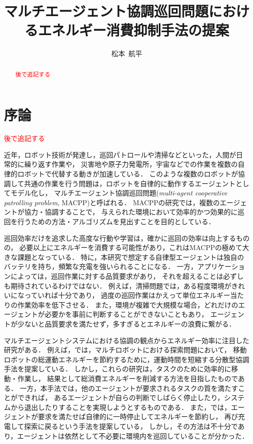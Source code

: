 \documentclass[12pt,a4j,twoside]{jarticle}
\title{マルチエージェント協調巡回問題におけるエネルギー消費抑制手法の提案}{5}
\author{松本~航平}
\def\red#1{\textcolor{red}{#1}}
\begin{document}
\maketitle

\begin{abstract}
  \red{後で追記する}
  \par
  
\end{abstract}

\vspace*{1cm}\par
\section{序論}\label{sec:introduction}
\red{後で追記する}\\
\par

近年，ロボット技術が発達し，巡回パトロールや清掃などといった，人間が日常的に繰り返す作業や，
災害地や原子力発電所，宇宙などでの作業を複数の自律的ロボットで代替する動きが加速している．
このような複数のロボットが協調して共通の作業を行う問題は，ロボットを自律的に動作するエージェントとしてモデル化し，
マルチエージェント協調巡回問題({\em multi-agent cooperative patrolling problem}, MACPP)と呼ばれる．
MACPPの研究では，複数のエージェントが協力・協調することで，
与えられた環境において効率的かつ効果的に巡回を行うための方法・アルゴリズムを見出すことを目的としている．
\par

巡回効率だけを追求した高度な行動や学習は，確かに巡回の効率は向上するものの，
必要以上にエネルギーを消費する可能性があり，これはMACPPの極めて大きな課題となっている．
特に，本研究で想定する自律型エージェントは独自のバッテリを持ち，頻繁な充電を強いられることになる．
一方，アプリケーションによっては，巡回作業に対する品質要求があり，
それを超えることは必ずしも期待されているわけではない．
例えば，清掃問題では，ある程度環境がきれいになっていれば十分であり，
過度の巡回作業はかえって単位エネルギー当たりの作業効率を低下させる．
また，環境が複雑で大規模な場合，どれだけのエージェントが必要かを事前に判断することができないこともあり，
エージェントが少ないと品質要求を満たせず，多すぎるとエネルギーの浪費に繋がる．
\par

マルチエージェントシステムにおける協調の観点からエネルギー効率に注目した研究\cite{Kim2016,Benkrid2019,Notomista2022}がある．
例えば，\cite{Benkrid2019}では，マルチロボットにおける探索問題において，
移動ロボットの総運動エネルギーを節約するために，運動時間を短縮する分散型協調手法を提案している．
しかし，これらの研究は，タスクのために効率的に移動・作業し，
結果として総消費エネルギーを削減する方法を目指したものである．
一方，本手法では，他のエージェントが要求されるタスクの質を満たすことができれば，
あるエージェントが自らの判断でしばらく停止したり，システムから退出したりすることを実現しようとするものである．
また，\cite{WuPrima2019, Wu2019}では，エージェントが要求を満たせば自律的に一時停止してエネルギーを節約し，
再び充電して探索に戻るという手法を提案している，
しかし，その方法は不十分であり，エージェントは依然として不必要に環境内を巡回していることが分かった．
\par
\end{document}
